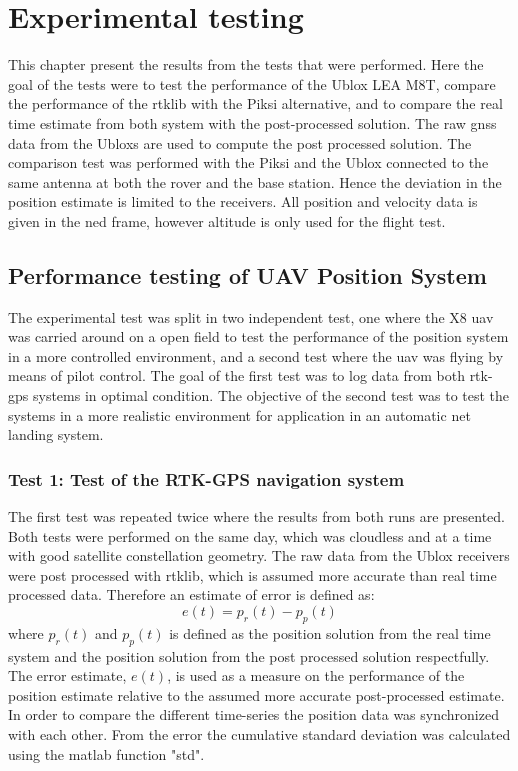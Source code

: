 
\chapter{Experimental testing}
This chapter present the results from the tests that were performed. Here the goal of the tests were to test the performance of the Ublox LEA M8T, compare the performance of the \acrfull{rtklib} with the Piksi alternative, and to compare the real time estimate from both system with the post-processed solution. The raw \gls{gnss} data from the Ubloxs are used to compute the post processed solution. The comparison test was performed with the Piksi and the Ublox connected to the same antenna at both the rover and the base station. Hence the deviation in the position estimate is limited to the receivers. All position and velocity data is given in the \gls{ned} frame, however altitude is only used for the flight test.
\section{Performance testing of UAV Position System}
The experimental test was split in two independent test, one where the X8 \gls{uav} was carried around on a open field to test the performance of the position system in a more controlled environment, and a second test where the \gls{uav} was flying by means of pilot control. The goal of the first test was to log data from both \gls{rtk-gps} systems in optimal condition. The objective of the second test was to test the systems in a more realistic environment for application in an automatic net landing system. 


\subsection{Test 1: Test of the RTK-GPS navigation system}
The first test was repeated twice where the results from both runs are presented. Both tests were performed on the same day, which was cloudless and at a time with good satellite constellation geometry. The raw data from the Ublox receivers were post processed with \gls{rtklib}, which is assumed more accurate than real time processed data. Therefore an estimate of error is defined as:
\begin{equation}
e(t) = p_r(t) - p_p(t)
\end{equation}
where $p_r(t)$ and $p_p(t)$ is defined as the position solution from the real time system and the position solution from the post processed solution respectfully. The error estimate, $e(t)$, is used as a measure on the performance of the position estimate relative to the assumed more accurate post-processed estimate. In order to compare the different time-series the position data was synchronized with each other. From the error the cumulative standard deviation was calculated using the matlab function "std".
